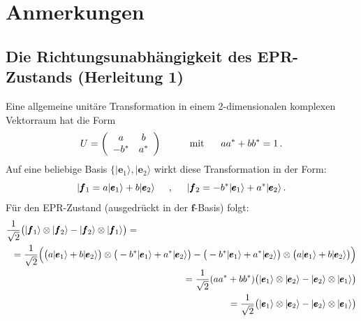 \section*{Anmerkungen}
\subsection*{Die Richtungsunabh\"angigkeit des EPR-Zustands (Herleitung 1)}
\label{sec_EPR_A}

Eine allgemeine unit\"are Transformation in einem 2-dimensionalen komplexen
Vektorraum hat die Form
\begin{equation}
             U = \left( \begin{array}{cc} a & b \\ - b^* & a^* \end{array} \right)
             \hspace{1cm} {\rm mit} \hspace{0.6cm}  a a^* + b b^* = 1 \, . 
\end{equation}
Auf eine beliebige Basis $\{ |\pmb{e}_1 \rangle, |\pmb{e}_2\rangle$ wirkt diese Transformation
in der Form:
\begin{equation}
    | \pmb{f}_1 = a | \pmb{e}_1 \rangle + b |\pmb{e}_2 \rangle \hspace{0.5cm} , \hspace{0.5cm}
     | \pmb{f}_2 = -b^* | \pmb{e}_1\rangle + a^* |\pmb{e}_2 \rangle \, . 
\end{equation}
F\"ur den EPR-Zustand (ausgedr\"uckt in der $\pmb{f}$-Basis) folgt:
\begin{eqnarray}
    \frac{1}{\sqrt{2}} \big(  | \pmb{f}_1 \rangle \otimes | \pmb{f}_2 \rangle - 
        | \pmb{f}_2 \rangle \otimes | \pmb{f}_1 \rangle \big)  & = & \\ 
        & &  \hspace*{-5cm} =
    \frac{1}{\sqrt{2}} \Big(  \big( a | \pmb{e}_1 \rangle + b |\pmb{e}_2 \rangle \big) 
        \otimes  \big(  -b^* | \pmb{e}_1\rangle + a^* |\pmb{e}_2 \rangle \big)
         -  \big( -b^* | \pmb{e}_1\rangle + a^* |\pmb{e}_2 \rangle \big) 
            \otimes \big(  a | \pmb{e}_1 \rangle + b |\pmb{e}_2 \rangle \big)  \Big)       \\   
        & &  \hspace*{-5cm} =
  \frac{1}{\sqrt{2}} ( a a^* + b b^*) \big( | \pmb{e}_1 \rangle \otimes | \pmb{e}_2 \rangle - 
        | \pmb{e}_2 \rangle \otimes | \pmb{e}_1 \rangle \big)  \\
                & &  \hspace*{-5cm} =
  \frac{1}{\sqrt{2}} \big( | \pmb{e}_1 \rangle \otimes | \pmb{e}_2 \rangle - 
        | \pmb{e}_2 \rangle \otimes | \pmb{e}_1 \rangle \big)  
\end{eqnarray}

